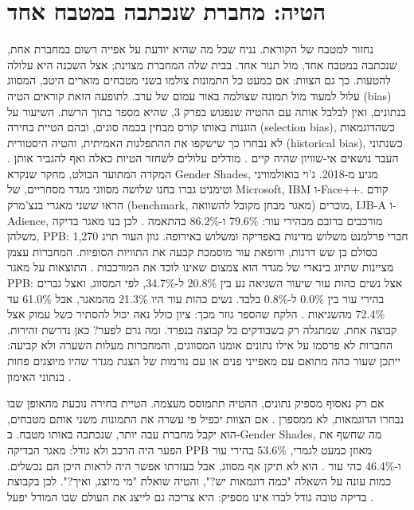 \section{הטיה: מחברת שנכתבה במטבח אחד}
נחזור למטבח של הקוראת. נניח שכל מה שהיא יודעת על אפייה רשום במחברת אחת, שנכתבה במטבח אחד, מול תנור אחד. בבית שלה המחברת מצוינת; אצל השכנה היא עלולה להטעות. כך גם הצוות: אם כמעט כל התמונות צולמו בשני מטבחים מוארים היטב, המסווג עלול למעוד מול תמונה שצולמה באור עמום של ערב.
לתופעה הזאת קוראים הטיה (bias) בנתונים, ואין לבלבל אותה עם ההטיה שנפגוש בפרק 3, שהיא מספר בתוך הרשת. השיעור על הוגנות באותו קורס מבחין בכמה סוגים, ובהם הטיית בחירה (selection bias), כשהדוגמאות לא נבחרו כך שישקפו את ההתפלגות האמיתית, והטיה היסטורית (historical bias), כשנתוני העבר נושאים אי-שוויון שהיה קיים \cite{S-ch02-14}. מודלים עלולים לשחזר הטיות כאלה ואף להגביר אותן \cite{S-ch02-04}.
המקרה המתועד הבולט, מחקר שנקרא Gender Shades, מגיע מ-2018. ג'וי בואולמוויני וטימניט גברו בחנו שלושה מסווגי מגדר מסחריים, של Microsoft, IBM ו-Face++. קודם הראו ששני מאגרי בנצ'מרק (benchmark, מאגר מבחן מקובל להשוואה) מוכרים, IJB-A ו-Adience, מורכבים ברובם מבהירי עור: 79.6\% ו-86.2\% בהתאמה \cite{S-ch02-01}. לכן בנו מאגר בדיקה משלהן, PPB: 1,270 חברי פרלמנט משלוש מדינות באפריקה ומשלוש באירופה. גוון העור תויג בסולם בן שש דרגות, ורופאת עור מוסמכת קבעה את התוויות הסופיות. המחברות עצמן מציינות שתיוג בינארי של מגדר הוא צמצום שאינו לוכד את המורכבות \cite{S-ch02-01}.
התוצאות על מאגר PPB: אצל נשים כהות עור שיעור השגיאה נע בין 20.8\% ל-34.7\%, לפי המסווג, ואצל גברים בהירי עור בין 0.0\% ל-0.8\% בלבד. נשים כהות עור היו 21.3\% מהמאגר, אבל 61.0\% עד 72.4\% מהשגיאות \cite{S-ch02-01}. הלקח שהספר גוזר מכך: ציון כולל נאה יכול להסתיר כשל עמוק אצל קבוצה אחת, שמתגלה רק כשבודקים כל קבוצה בנפרד.
ומה גרם לפער? כאן נדרשת זהירות. החברות לא פרסמו על אילו נתונים אומנו המסווגים, והמחברות מעלות השערה ולא קביעה: ייתכן שעור כהה מתואם עם מאפייני פנים או עם נורמות של הצגת מגדר שהיו מיוצגים פחות בנתוני האימון \cite{S-ch02-01}.
\begin{mythbox}
\mythlabel אם רק נאסוף מספיק נתונים, ההטיה תתמוסס מעצמה.
\tcblower
\realitylabel הטיית בחירה נובעת מהאופן שבו נבחרו הדוגמאות, לא ממספרן \cite{S-ch02-14}. אם הצוות יכפיל פי עשרה את התמונות משני אותם מטבחים, הוא יקבל מחברת עבה יותר, שנכתבה באותו מטבח. ב-Gender Shades, מה שחשף את הפער היה הרכב ולא גודל: מאגר הבדיקה PPB מאוזן כמעט לגמרי, 53.6\% בהירי עור ו-46.4\% כהי עור \cite{S-ch02-01}. הוא לא תיקן אף מסווג, אבל בעזרתו אפשר היה לראות היכן הם נכשלים. כמות עונה על השאלה "כמה דוגמאות יש?", והטיה שואלת "מי מיוצג, ואיך?". לכן בקבוצת בדיקה טובה גודל לבדו אינו מספיק: היא צריכה גם לייצג את העולם שבו המודל יפעל \cite{S-ch02-10}.
\end{mythbox}
